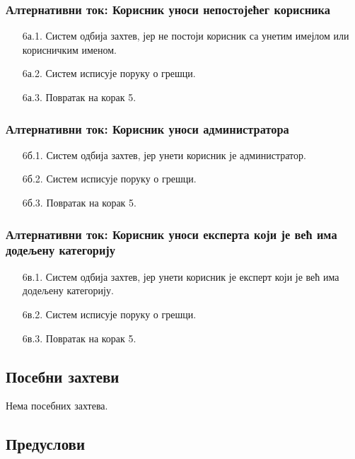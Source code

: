 \subsubsection{Алтернативни ток: Корисник уноси непостојећег корисника}

\begin{enumerate}
    \item [6а.1.] Систем одбија захтев, јер не постоји корисник са унетим имејлом или корисничким
      именом.
    \item [6а.2.] Систем исписује поруку о грешци.
    \item [6а.3.] Повратак на корак 5.
\end{enumerate}

\subsubsection{Алтернативни ток: Корисник уноси администратора}

\begin{enumerate}
    \item [6б.1.] Систем одбија захтев, јер унети корисник је администратор.
    \item [6б.2.] Систем исписује поруку о грешци.
    \item [6б.3.] Повратак на корак 5.
\end{enumerate}

\subsubsection{Алтернативни ток: Корисник уноси експерта који је већ има додељену категорију}

\begin{enumerate}
    \item [6в.1.] Систем одбија захтев, јер унети корисник је експерт који је већ има додељену
      категорију.
    \item [6в.2.] Систем исписује поруку о грешци.
    \item [6в.3.] Повратак на корак 5.
\end{enumerate}

\subsection{Посебни захтеви}

Нема посебних захтева.

\subsection{Предуслови}

